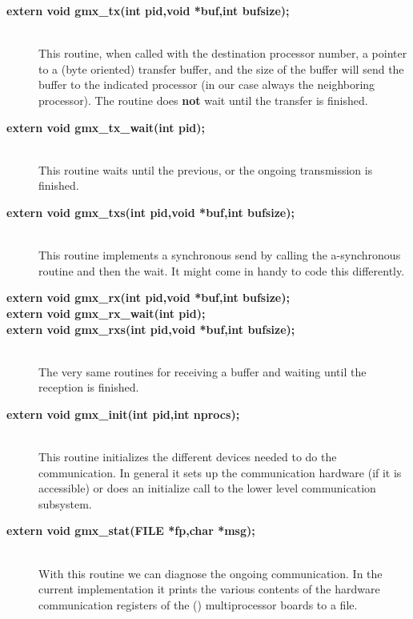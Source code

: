 \begin{description}
\item[{\bf extern void gmx\_tx(int pid,void *buf,int bufsize);}]\mbox{}\\ 
This routine, when called with the destination processor number, a
pointer to a (byte oriented) transfer buffer, and the size of the
buffer will send the buffer to the indicated processor (in our case
always the neighboring processor). The routine does {\bf not} wait
until the transfer is finished.

\item[{\bf extern void gmx\_tx\_wait(int pid);}]\mbox{}\\
This routine waits until the previous, or the ongoing transmission is
finished.

\item[{\bf extern void gmx\_txs(int pid,void *buf,int bufsize);}]\mbox{}\\
This routine implements a synchronous send by calling the
a-synchronous routine and then the wait. It might come in handy to
code this differently.

\item[{\bf extern void gmx\_rx(int pid,void *buf,int bufsize);}]
\item[{\bf extern void gmx\_rx\_wait(int pid);}]\vspace{-\itemsep}
\item[{\bf extern void gmx\_rxs(int pid,void *buf,int bufsize);}]\vspace{-\itemsep}\mbox{}\\
The very same routines for receiving a buffer and waiting until the
reception is finished.

\item[{\bf extern void gmx\_init(int pid,int nprocs);}]\mbox{}\\
This routine initializes the different devices needed to do the
communication. In general it sets up the communication hardware (if it
is accessible) or does an initialize call to the lower level
communication subsystem.

\item[{\bf extern void gmx\_stat(FILE *fp,char *msg);}]\mbox{}\\
With this routine we can diagnose the ongoing communication. In the
current implementation it prints the various contents of the hardware
communication registers of the (\intel) multiprocessor boards to a
file.
\end{description}

